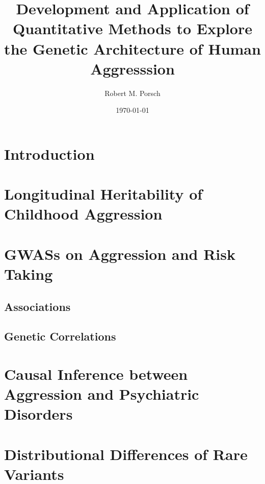 \documentclass{beamer}
\title{Development and Application of Quantitative Methods to Explore the Genetic Architecture of Human Aggresssion}
\date{\today}
\author{Robert M. Porsch}
\institute{Department of Psychiatry}
\begin{document}
  \maketitle
	\tableofcontents

  \section{Introduction}
  \section{Longitudinal Heritability of Childhood Aggression}
  \section{GWASs on Aggression and Risk Taking}
  \subsection{Associations}
  \subsection{Genetic Correlations}
  \section{Causal Inference between Aggression and Psychiatric Disorders}
  \section{Distributional Differences of Rare Variants}
  
\end{document}
